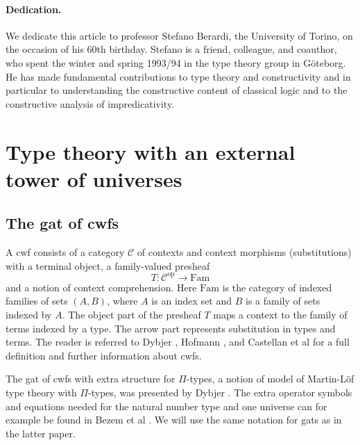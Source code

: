 \documentclass[11pt,a4paper]{article}
\theoremstyle{plain}
\theoremstyle{definition}
\newcommand{\op}{\mathrm{op}}
\def\Fam{\mathrm{Fam}}
\def\C{\mathcal{C}}
\begin{document}
\paragraph{Dedication.} We dedicate this article to professor Stefano Berardi, the University of Torino, on the occasion of his 60th birthday. Stefano is a friend, colleague, and coauthor, who spent the winter and spring 1993/94 in the type theory group in Göteborg. He has made fundamental contributions to type theory and constructivity and in particular to understanding the constructive content of classical logic and to the constructive analysis of impredicativity.

\section{Type theory with an external tower of universes}\label{sigmaext}

\subsection{The gat of cwfs} A cwf consists of a category $\C$ of contexts and context morphisms (substitutions) with a terminal object, a family-valued presheaf
$$
T : \C^\op \to \Fam
$$
and a notion of context comprehension. Here $\Fam$ is the category of indexed families of sets $(A,B)$, where $A$ is an index set and $B$ is a family of sets indexed by $A$. The object part of the presheaf $T$ maps a context to the family of terms indexed by a type. The arrow part represents substitution in types and terms. The reader is referred to Dybjer \cite{dybjer:torino}, Hofmann \cite{hofmann:cambridge}, and Castellan et al \cite{castellan:lambek} for a full definition and further information about cwfs.

The gat of cwfs with extra structure for $\Pi$-types, a notion of model of Martin-Löf type theory with $\Pi$-types, was presented by Dybjer \cite{dybjer:torino}. The extra operator symbols and equations needed for the natural number type and one universe can for example be found in Bezem et al \cite{bezem:hofmann}. We will use the same notation for gats as in the latter paper.

%
\end{document}
